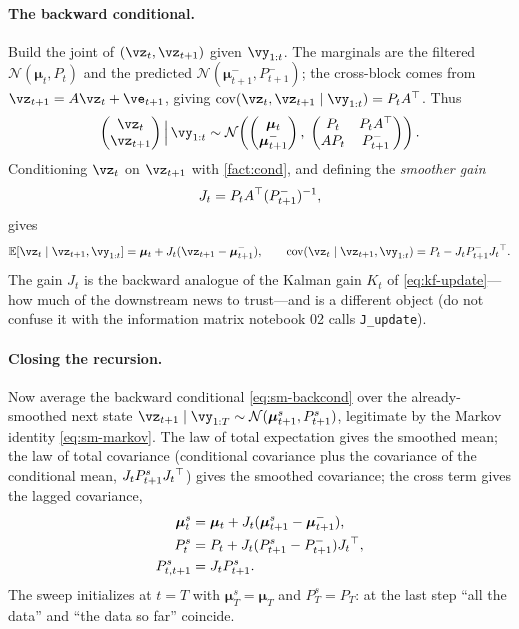 \documentclass[11pt]{article}
\theoremstyle{plain}
\theoremstyle{definition}
\theoremstyle{remark}
\theoremstyle{definition}
\newcommand{\E}{\mathbb{E}}
\newcommand{\Normal}{\mathcal{N}}
\newcommand{\vmu}{\bm{\mu}}
\begin{document}
\paragraph{The backward conditional.} Build the joint of $(\vz_t, \vz_{t+1})$
given $\vy_{1:t}$. The marginals are the filtered $\Normal(\vmu_t, P_t)$ and the
predicted $\Normal(\vmu_{t+1}^-, P_{t+1}^-)$; the cross-block comes from
$\vz_{t+1} = A\vz_t + \ve_{t+1}$, giving $\cov(\vz_t, \vz_{t+1} \mid \vy_{1:t}) =
P_t A\trp$. Thus
\begin{equation}\label{eq:sm-joint}
    \begin{pmatrix} \vz_t \\ \vz_{t+1} \end{pmatrix} \Big|\, \vy_{1:t}
    \sim \Normal\!\left(
        \begin{pmatrix} \vmu_t \\ \vmu_{t+1}^- \end{pmatrix},\;
        \begin{pmatrix} P_t & P_t A\trp \\ A P_t & P_{t+1}^- \end{pmatrix}
    \right) .
\end{equation}
Conditioning $\vz_t$ on $\vz_{t+1}$ with \cref{fact:cond}, and defining the
\emph{smoother gain}
\begin{equation}\label{eq:sm-gain}
    J_t = P_t A{^\top} (P_{t+1}^-)^{-1},
\end{equation}
gives
\begin{equation}\label{eq:sm-backcond}
    \E[\vz_t \mid \vz_{t+1}, \vy_{1:t}] = \vmu_t + J_t(\vz_{t+1} - \vmu_{t+1}^-),
    \qquad
    \cov(\vz_t \mid \vz_{t+1}, \vy_{1:t}) = P_t - J_t P_{t+1}^- J_t\trp .
\end{equation}
The gain $J_t$ is the backward analogue of the Kalman gain $K_t$ of
\eqref{eq:kf-update}---how much of the downstream news to trust---and is a
different object (do not confuse it with the information matrix notebook 02 calls
\texttt{J\_update}).

\paragraph{Closing the recursion.} Now average the backward conditional
\eqref{eq:sm-backcond} over the already-smoothed next state $\vz_{t+1} \mid
\vy_{1:T} \sim \Normal(\vmu_{t+1}^s, P_{t+1}^s)$, legitimate by the Markov
identity \eqref{eq:sm-markov}. The law of total expectation gives the smoothed
mean; the law of total covariance (conditional covariance plus the covariance of
the conditional mean, $J_t P_{t+1}^s J_t{^\top}$) gives the smoothed covariance; the
cross term gives the lagged covariance,
\begin{align}
    \vmu_t^s &= \vmu_t + J_t(\vmu_{t+1}^s - \vmu_{t+1}^-), \label{eq:sm-mean}\\
    P_t^s &= P_t + J_t(P_{t+1}^s - P_{t+1}^-) J_t\trp, \label{eq:sm-cov}\\
    P_{t,t+1}^s &= J_t P_{t+1}^s . \label{eq:sm-cross}
\end{align}
The sweep initializes at $t = T$ with $\vmu_T^s = \vmu_T$ and $P_T^s = P_T$: at
the last step ``all the data'' and ``the data so far'' coincide.
\end{document}
